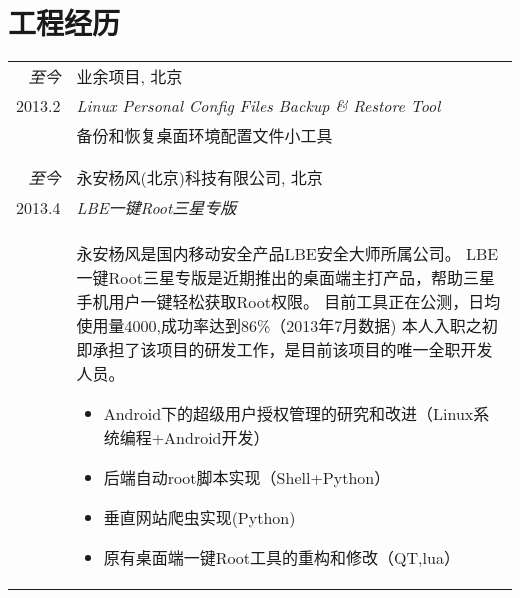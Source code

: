 \documentclass[a4paper,10pt]{article} %
\begin{document}
\section{工程经历}
\begin{tabular}{r|p{11cm}}
\emph{至今} &  业余项目, 北京\smallskip\\
\textsc{2013.2} & \emph{Linux Personal Config Files Backup \& Restore Tool}\\ 
& \footnotesize{备份和恢复桌面环境配置文件小工具}\\
\multicolumn{2}{c}{} \\

\multicolumn{2}{c}{} \\
\emph{至今} &  \textsc{永安杨风(北京)科技有限公司}, 北京 \smallskip\\
\textsc{2013.4} & \emph{LBE一键Root三星专版}\\ 
& \footnotesize{
永安杨风是国内移动安全产品LBE安全大师所属公司。\linebreak
LBE一键Root三星专版是近期推出的桌面端主打产品，帮助三星手机用户一键轻松获取Root权限。
目前工具正在公测，日均使用量4000,成功率达到86\%（2013年7月数据)
本人入职之初即承担了该项目的研发工作，是目前该项目的唯一全职开发人员。
\begin{itemize}
\item Android下的超级用户授权管理的研究和改进（Linux系统编程+Android开发）
\item 后端自动root脚本实现（Shell+Python）
\item 垂直网站爬虫实现(Python)
\item 原有桌面端一键Root工具的重构和修改（QT,lua）
\end{itemize}

}\smallskip\\


\end{tabular}
\end{document}
